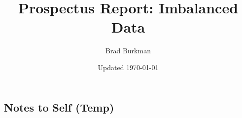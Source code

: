 \documentclass[11pt]{report}
\title{Prospectus Report:  Imbalanced Data}
\author{Brad Burkman}
\date{Updated \today}
\begin{document}
\setlength{\parindent}{20pt}
\begin{spacing}{1.2}
\setcounter{chapter}{-1}




\newpage
\chapter{Notes to Self (Temp)}
\localtableofcontents\newpage





\end{spacing}
\end{document}
